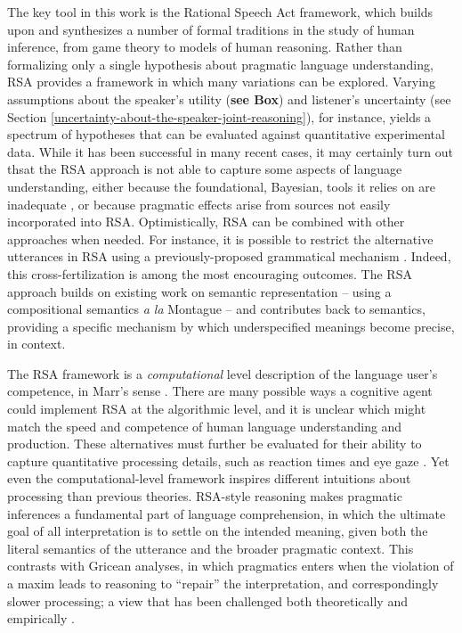 \documentclass[]{elsarticle}
\begin{document}
The key tool in this work is the Rational Speech Act framework, which builds upon and synthesizes a
number of formal traditions in the study of human inference, from game
theory to models of human reasoning. 
Rather than formalizing only a single hypothesis about pragmatic language understanding, 
RSA provides a framework in which many variations can be explored. 
Varying assumptions about the speaker's utility (\textbf{see Box}) 
and listener's uncertainty (see Section \ref{uncertainty-about-the-speaker-joint-reasoning}), for instance, 
yields a spectrum of hypotheses that can be evaluated against quantitative experimental data.
While it has been successful in many recent cases, it may certainly turn out thsat the RSA approach is not able to capture 
some aspects of language understanding, either because the foundational, Bayesian, tools it relies on are inadequate \citep{jones2011}, or because pragmatic effects arise from sources not easily incorporated into RSA. 
Optimistically, RSA can be combined with other approaches when needed. 
For instance, it is possible \citep{potts2015} to restrict the alternative utterances in RSA using a previously-proposed grammatical mechanism \citep{Fox2011}.
Indeed, this cross-fertilization is among the most encouraging outcomes.
The RSA approach builds on existing
work on semantic representation -- using a compositional semantics
\emph{a la} Montague \citep{dowty2012} -- and contributes back to semantics, providing a
specific mechanism by which underspecified meanings become precise, in
context.




The RSA framework is a \emph{computational} level description of the
language user's competence, in Marr's sense \citep{marr1982}. 
There are many
possible ways a cognitive agent could implement RSA at the algorithmic
level, and it is unclear which might match the speed and competence of human language understanding and production. 
These alternatives must further be evaluated for their ability to capture
quantitative processing details, such as reaction times and eye gaze \citep{degen2015,nordmeyer2014}. 
Yet even the computational-level framework inspires different intuitions about processing than previous theories.
RSA-style reasoning makes pragmatic inferences a fundamental part of language comprehension, 
in which the ultimate goal of all interpretation is to settle on the intended
meaning, given both the literal semantics of the utterance and the
broader pragmatic context. 
This contrasts with Gricean analyses, in which pragmatics enters when the violation of a maxim leads to reasoning
to ``repair'' the interpretation, and correspondingly slower processing; a view that has been
challenged both theoretically and empirically \citep[e.g.,][]{levinson2000,grodner2010}.
\end{document}
